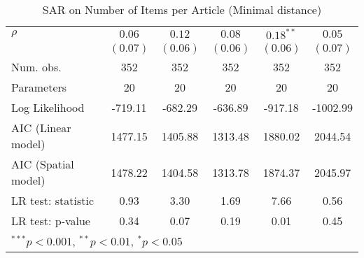 \begin{table}[!h]
\begin{center}
\begin{tabular}{l c c c c c }
$\rho$                  & $0.06$       & $0.12$       & $0.08$       & $0.18^{**}$  & $0.05$       \\
                        & $(0.07)$     & $(0.06)$     & $(0.06)$     & $(0.06)$     & $(0.07)$     \\
\midrule
Num. obs.               & 352          & 352          & 352          & 352          & 352          \\
Parameters              & 20           & 20           & 20           & 20           & 20           \\
Log Likelihood          & -719.11      & -682.29      & -636.89      & -917.18      & -1002.99     \\
AIC (Linear model)      & 1477.15      & 1405.88      & 1313.48      & 1880.02      & 2044.54      \\
AIC (Spatial model)     & 1478.22      & 1404.58      & 1313.78      & 1874.37      & 2045.97      \\
LR test: statistic      & 0.93         & 3.30         & 1.69         & 7.66         & 0.56         \\
LR test: p-value        & 0.34         & 0.07         & 0.19         & 0.01         & 0.45         \\
\bottomrule
\multicolumn{6}{l}{\scriptsize{$^{***}p<0.001$, $^{**}p<0.01$, $^*p<0.05$}}
\end{tabular}
\caption{SAR on Number of Items per Article (Minimal distance)}
\label{table:coefficients}
\end{center}
\end{table}
